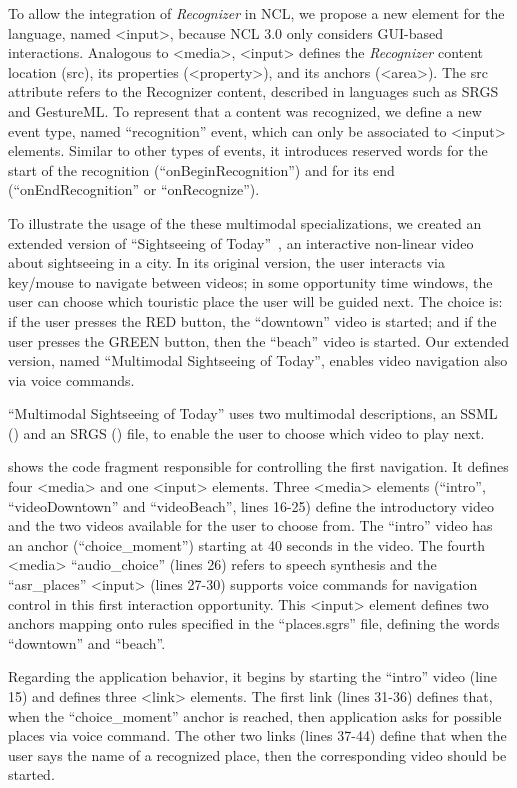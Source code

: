 To allow the integration of \textit{Recognizer} in NCL, we propose a new
element for the
language, named <input>, because NCL 3.0 only considers GUI-based interactions.
Analogous to <media>, <input> defines the \textit{Recognizer} content location
(src),
its properties (<property>), and its anchors (<area>). The src attribute refers
to the Recognizer content, described in languages such as SRGS and GestureML.
To represent that a content was recognized, we define a new event type,
named “recognition” event, which can only be associated to <input> elements.
Similar to other types of events, it introduces reserved words for the start of
the recognition (“onBeginRecognition”) and for its end (“onEndRecognition” or
“onRecognize”).

To illustrate the usage of the these multimodal specializations, we created an
extended version of “Sightseeing of Today”~\cite{fernando_o_2009}, an
interactive non-linear video~\cite{meixner_interactive_2012} about sightseeing
in a city. In its original version, the user interacts
via key/mouse to navigate between videos; in some opportunity time windows, the
user can choose which touristic place the user will be guided next. The choice
is: if the user presses the RED button, the “downtown” video is started; and if
the user presses the GREEN button, then the “beach” video is started. Our
extended version, named “Multimodal Sightseeing of Today”, enables video
navigation also via voice commands.

“Multimodal Sightseeing of Today” uses two multimodal descriptions, an SSML
() and an SRGS () file, to enable the user to
choose which video to play next.

 shows the code fragment responsible for controlling
the first
navigation. It defines four <media> and one <input> elements. Three <media>
elements (“intro”, “videoDowntown” and “videoBeach”, lines 16-25) define the
introductory video and the two videos available for the user to choose from.
The “intro” video has an anchor (“choice\_moment”) starting at 40 seconds in
the
video. The fourth <media> “audio\_choice” (lines 26) refers to speech synthesis
and the “asr\_places” <input> (lines 27-30) supports voice commands for
navigation control in this first interaction opportunity. This <input> element
defines two anchors mapping onto rules specified in the “places.sgrs” file,
defining the words “downtown” and “beach”.

Regarding the application behavior, it begins by starting the “intro” video
(line 15) and defines three <link> elements. The first link (lines 31-36)
defines that, when the “choice\_moment” anchor is reached, then application
asks
for possible places via voice command. The other two links (lines 37-44) define
that when the user says the name of a recognized place, then the corresponding
video should be started.


